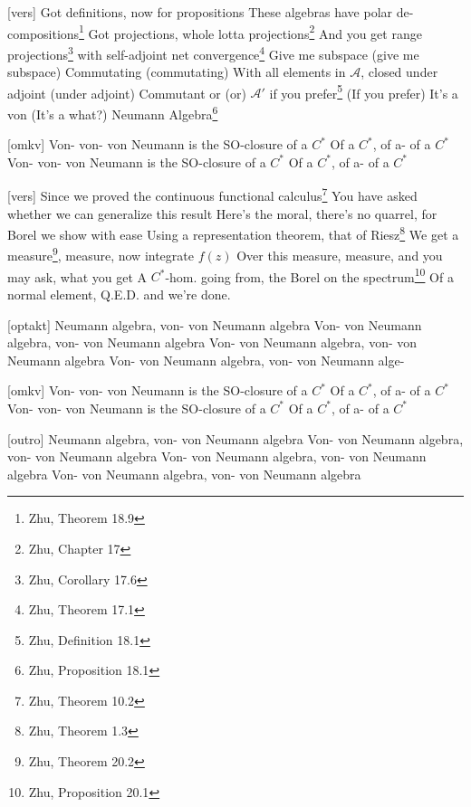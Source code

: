 \documentclass[a4paper,11pt]{article}
\begin{document}
\begin{song}
[vers] Got definitions, now for propositions
These algebras have polar de-compositions\footnote{Zhu, Theorem 18.9}
Got projections, whole lotta projections\footnote{Zhu, Chapter 17}
And you get range projections\footnote{Zhu, Corollary 17.6} with self-adjoint net convergence\footnote{Zhu, Theorem 17.1}
Give me subspace (give me subspace)
Commutating (commutating)
With all elements in $\mathcal{A}$, closed under adjoint (under adjoint)
Commutant or (or)
$\mathcal{A}'$ if you prefer\footnote{Zhu, Definition 18.1} (If you prefer)
It’s a von (It’s a what?)
Neumann Algebra\footnote{Zhu, Proposition 18.1}

[omkv] Von- von- von Neumann is the SO-closure of a $C^\ast$
Of a $C^\ast$, of a- of a $C^\ast$
Von- von- von Neumann is the SO-closure of a $C^\ast$
Of a $C^\ast$, of a- of a $C^\ast$

[vers] Since we proved the continuous functional calculus\footnote{Zhu, Theorem 10.2}
You have asked whether we can generalize this result
Here’s the moral, there’s no quarrel, for Borel we show with ease
Using a representation theorem, that of Riesz\footnote{Zhu, Theorem 1.3}
We get a measure\footnote{Zhu, Theorem 20.2}, measure, now integrate $f(z)$
Over this measure, measure, and you may ask, what you get
A $C^\ast$-hom. going from, the Borel on the spectrum\footnote{Zhu, Proposition 20.1}
Of a normal element, Q.E.D. and we’re done.

[optakt] Neumann algebra, von- von Neumann algebra
  Von- von Neumann algebra, von- von Neumann algebra
  Von- von Neumann algebra, von- von Neumann algebra
  Von- von Neumann algebra, von- von Neumann alge-

[omkv] Von- von- von Neumann is the SO-closure of a $C^\ast$
Of a $C^\ast$, of a- of a $C^\ast$
Von- von- von Neumann is the SO-closure of a $C^\ast$
Of a $C^\ast$, of a- of a $C^\ast$

[outro] Neumann algebra, von- von Neumann algebra
  Von- von Neumann algebra, von- von Neumann algebra
  Von- von Neumann algebra, von- von Neumann algebra
  Von- von Neumann algebra, von- von Neumann algebra


\end{song}
\end{document}
